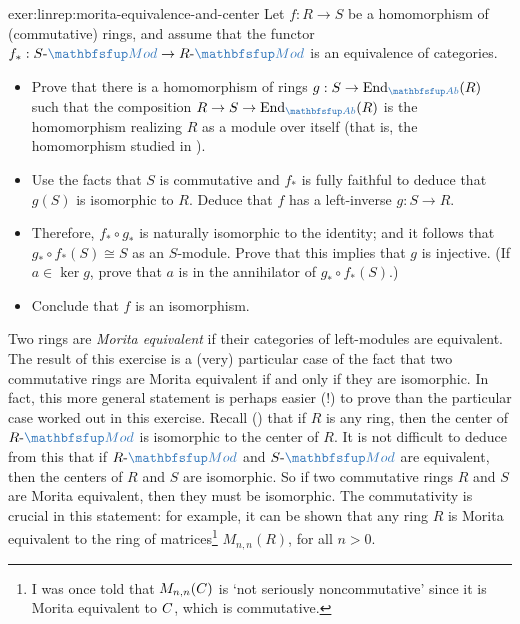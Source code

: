 \begin{exer}{}{exer:linrep:morita-equivalence-and-center}
  Let $f : R \to S$ be a homomorphism of (commutative) rings, and
  assume that the functor
  $f_* : S\text{-}\categ{Mod} \to R\text{-}\categ{Mod}$ is an
  equivalence of categories.
  \begin{itemize}
  \item Prove that there is a homomorphism of rings
    $g : S \to \mathrm{End}_{\categ{Ab}}(R)$ such that the composition
    $R \to S \to \mathrm{End}_{\categ{Ab}}(R)$ is the homomorphism
    realizing $R$ as a module over itself (that is, the homomorphism
    studied in ).
  \item Use the facts that $S$ is commutative and $f_*$ is fully
    faithful to deduce that $g(S)$ is isomorphic to $R$. Deduce that
    $f$ has a left-inverse $g : S \to R$.
  \item Therefore, $f_* \circ g_*$ is naturally isomorphic to the
    identity; and it follows that $g_* \circ f_*(S) \cong S$ as an
    $S$-module. Prove that this implies that $g$ is injective. (If
    $a \in \ker g$, prove that $a$ is in the annihilator of
    $g_* \circ f_*(S)$.)
  \item Conclude that $f$ is an isomorphism.
  \end{itemize}
  Two rings are \emph{Morita equivalent}
  if their categories of
  left-modules are equivalent. The result of this exercise is a (very)
  particular case of the fact that two commutative rings are Morita
  equivalent if and only if they are isomorphic. In fact, this more
  general statement is perhaps easier (!) to prove than the particular
  case worked out in this exercise. Recall
  ()
  that if $R$ is any ring, then the center of $R\text{-}\categ{Mod}$
  is isomorphic to the center of $R$. It is not difficult to deduce
  from this that if $R\text{-}\categ{Mod}$ and $S\text{-}\categ{Mod}$
  are equivalent, then the centers of $R$ and $S$ are isomorphic. So
  if two commutative rings $R$ and $S$ are Morita equivalent, then
  they must be isomorphic.  The commutativity is crucial in this
  statement: for example, it can be shown that any ring $R$ is Morita
  equivalent to the ring of matrices\footnote{I was once told that
    $M_{n,n}(C)$ is `not seriously noncommutative' since it is Morita
    equivalent to $C$, which is commutative.}  $M_{n,n}(R)$, for all
  $n > 0$.
\end{exer}

